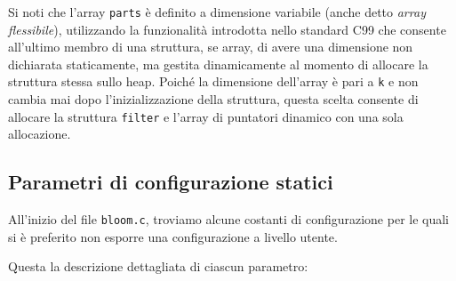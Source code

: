 Si noti che l'array \verb|parts| è definito a dimensione variabile (anche detto \emph{array
flessibile}), utilizzando la funzionalità introdotta nello standard C99 che consente all'ultimo
membro di una struttura, se array, di avere una dimensione non dichiarata staticamente, ma gestita
dinamicamente al momento di allocare la struttura stessa sullo heap. Poiché la dimensione dell'array
è pari a \verb|k| e non cambia mai dopo l'inizializzazione della struttura, questa scelta consente
di allocare la struttura \verb|filter| e l'array di puntatori dinamico con una sola allocazione.

\subsection{Parametri di configurazione statici}

All'inizio del file \verb|bloom.c|, troviamo alcune costanti di configurazione per le quali si è
preferito non esporre una configurazione a livello utente.



Questa la descrizione dettagliata di ciascun parametro:

